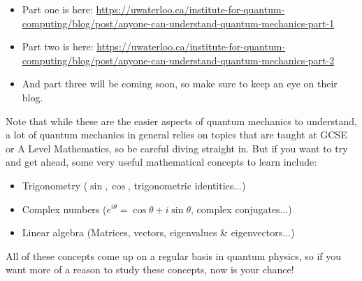 \documentclass[twocolumn]{article}
\begin{document}
\begin{itemize}
\item Part one is here: \url{https://uwaterloo.ca/institute-for-quantum-computing/blog/post/anyone-can-understand-quantum-mechanics-part-1}
\item Part two is here: \url{https://uwaterloo.ca/institute-for-quantum-computing/blog/post/anyone-can-understand-quantum-mechanics-part-2}
\item And part three will be coming soon, so make sure to keep an eye on their blog.
\end{itemize}

Note that while these are the easier aspects of quantum mechanics to understand, a lot of quantum mechanics in general relies on topics that are taught at GCSE or A Level Mathematics, so be careful diving straight in. But if you want to try and get ahead, some very useful mathematical concepts to learn include:

\begin{itemize}
\item Trigonometry ($\sin, \cos$, trigonometric identities...)
\item Complex numbers ($e^{i\theta} = \cos\theta + i\sin\theta$, complex conjugates...)
\item Linear algebra (Matrices, vectors, eigenvalues \& eigenvectors...)
\end{itemize}

All of these concepts come up on a regular basis in quantum physics, so if you want more of a reason to study these concepts, now is your chance!
\end{document}
